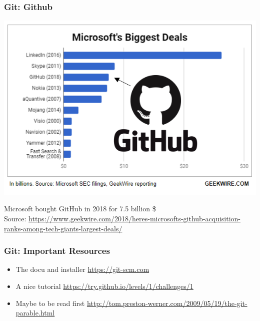 \documentclass{beamer} %
\begin{document}
\begin{frame}[t]
\frametitle{Git: Github}
	\begin{center}
		
		\includegraphics[scale=0.75]{assets/Microsoftbiggestdeals.png}
		
		Microsoft bought GitHub in 2018 for 7.5 billion \$\\
		Source: \url{https://www.geekwire.com/2018/heres-microsofts-github-acquisition-ranks-among-tech-giants-largest-deals/}
		
	\end{center}
\end{frame}

\begin{frame}[t]
\frametitle{Git: Important Resources}
\begin{itemize}
    \setlength\itemsep{1em}
	\item The docu and installer \newline \url{https://git-scm.com} \newline
    \item A nice tutorial \newline \url{https://try.github.io/levels/1/challenges/1} \newline
    \item Maybe to be read first \newline \url{http://tom.preston-werner.com/2009/05/19/the-git-parable.html} \newline
\end{itemize}
\end{frame}
\end{document}

